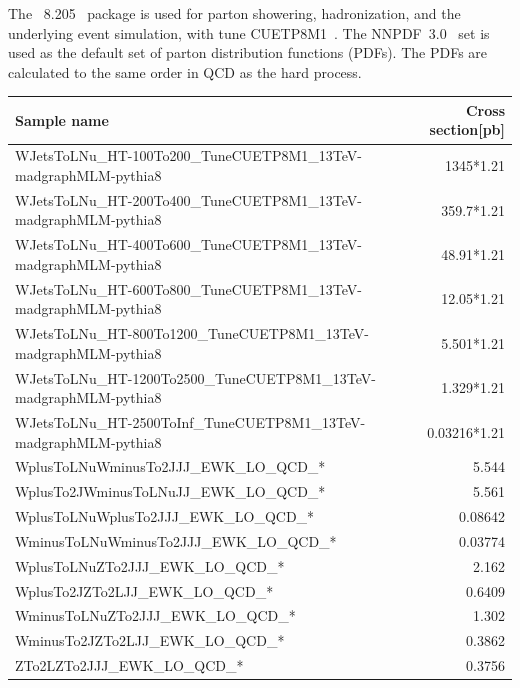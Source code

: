 The \PYTHIA~8.205~\cite{Sjostrand:2015} package is used  for parton showering, hadronization, and the underlying event simulation, with tune CUETP8M1~\cite{Skands:2014pea,Khachatryan:2015pea}. The NNPDF~3.0~\cite{nnpdf} set is used as the default set of parton distribution functions (PDFs). The PDFs are calculated to the same order in QCD as the hard process. 

\begin{table}[!htbp]
\footnotesize
\centering
 {\scriptsize
\begin{tabular}{lr}
\textbf{Sample name} & \textbf{Cross section[pb]} \\
\hline
WJetsToLNu\_{}HT-100To200\_{}TuneCUETP8M1\_{}13TeV-madgraphMLM-pythia8  & 1345*1.21 \\
WJetsToLNu\_{}HT-200To400\_{}TuneCUETP8M1\_{}13TeV-madgraphMLM-pythia8 & 359.7*1.21 \\
WJetsToLNu\_{}HT-400To600\_{}TuneCUETP8M1\_{}13TeV-madgraphMLM-pythia8 & 48.91*1.21 \\
WJetsToLNu\_{}HT-600To800\_{}TuneCUETP8M1\_{}13TeV-madgraphMLM-pythia8 & 12.05*1.21 \\
WJetsToLNu\_{}HT-800To1200\_{}TuneCUETP8M1\_{}13TeV-madgraphMLM-pythia8 & 5.501*1.21 \\
WJetsToLNu\_{}HT-1200To2500\_{}TuneCUETP8M1\_{}13TeV-madgraphMLM-pythia8 & 1.329*1.21 \\
WJetsToLNu\_{}HT-2500ToInf\_{}TuneCUETP8M1\_{}13TeV-madgraphMLM-pythia8 & 0.03216*1.21 \\
\hline
WplusToLNuWminusTo2JJJ\_{}EWK\_{}LO\_{}QCD\_{}*	&	5.544\\
WplusTo2JWminusToLNuJJ\_{}EWK\_{}LO\_{}QCD\_{}*	&	5.561\\
WplusToLNuWplusTo2JJJ\_{}EWK\_{}LO\_{}QCD\_{}*	        &	0.08642\\
WminusToLNuWminusTo2JJJ\_{}EWK\_{}LO\_{}QCD\_{}*       &	0.03774\\
WplusToLNuZTo2JJJ\_{}EWK\_{}LO\_{}QCD\_{}*		&	2.162\\
WplusTo2JZTo2LJJ\_{}EWK\_{}LO\_{}QCD\_{}*		&	0.6409\\
WminusToLNuZTo2JJJ\_{}EWK\_{}LO\_{}QCD\_{}*		&	1.302\\
WminusTo2JZTo2LJJ\_{}EWK\_{}LO\_{}QCD\_{}*		&	0.3862\\
ZTo2LZTo2JJJ\_{}EWK\_{}LO\_{}QCD\_{}*			&	0.3756\\

\end{tabular}}
\end{table}
